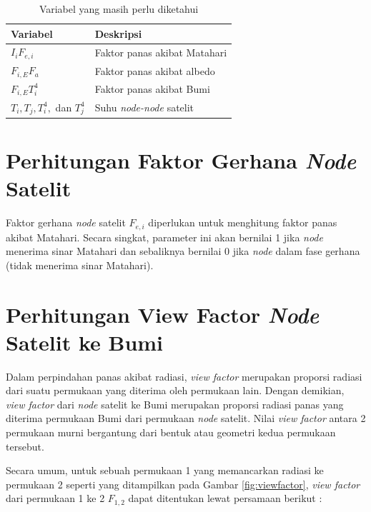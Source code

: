 \begin{table}[!ht]
\begin{center}
\caption{Variabel yang masih perlu diketahui}
\label{table:unknown}
\begin{tabular}{|l|l|}
\hline
Variabel & Deskripsi \\ \hline
	$I_i F_{e,i}$        & Faktor panas akibat Matahari         \\ \hline
	$F_{i,E} F_a$        & Faktor panas akibat albedo         \\ \hline
	$F_{i,E} T_i^4$        & Faktor panas akibat Bumi         \\ \hline
	$T_i, T_j, T_i^4,$ dan $T_j^4$        & Suhu \textit{node-node} satelit         \\ \hline
\end{tabular}
\end{center}
\vspace{-5mm}
\end{table}

\section{Perhitungan Faktor Gerhana \textit{Node} Satelit}

Faktor gerhana \textit{node} satelit $F_{e,i}$ diperlukan untuk menghitung faktor panas
akibat Matahari. Secara singkat, parameter ini akan bernilai 1 jika \textit{node}
menerima sinar Matahari dan sebaliknya bernilai 0 jika \textit{node} dalam fase gerhana
(tidak menerima sinar Matahari).

\section{Perhitungan View Factor \textit{Node} Satelit ke Bumi}

Dalam perpindahan panas akibat radiasi, \textit{view factor} merupakan proporsi
radiasi dari suatu permukaan yang diterima oleh permukaan lain. Dengan
demikian, \textit{view factor} dari \textit{node} satelit ke Bumi merupakan
proporsi radiasi panas yang diterima permukaan Bumi dari permukaan
\textit{node} satelit. Nilai \textit{view factor} antara 2 permukaan murni
bergantung dari bentuk atau geometri kedua permukaan tersebut.

Secara umum, untuk sebuah permukaan 1 yang memancarkan radiasi ke permukaan 2 seperti yang
ditampilkan pada Gambar \ref{fig:viewfactor}, \textit{view factor} dari
permukaan 1 ke 2 $F_{1,2}$ dapat ditentukan lewat persamaan berikut
\cite{muneer2020}:


